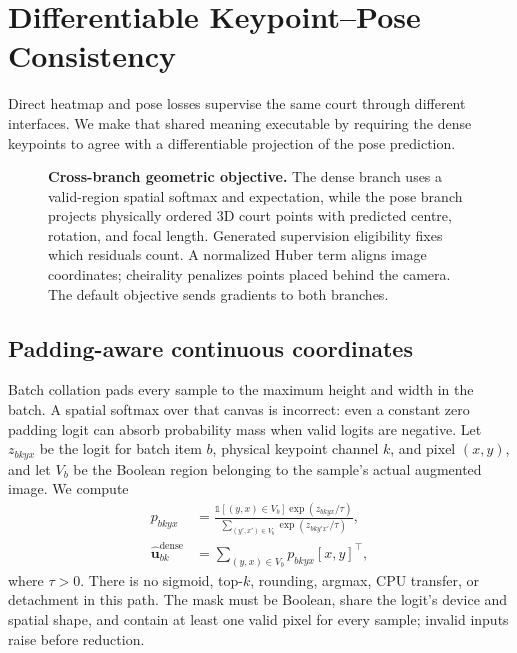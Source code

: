 \section{Differentiable Keypoint--Pose Consistency}
\label{sec:consistency}

Direct heatmap and pose losses supervise the same court through different
interfaces.  We make that shared meaning executable by requiring the dense
keypoints to agree with a differentiable projection of the pose prediction.

\begin{figure}[t]
  \centering
  \resizebox{\linewidth}{!}{}
  \caption{\textbf{Cross-branch geometric objective.}  The dense branch uses a
  valid-region spatial softmax and expectation, while the pose branch projects
  physically ordered 3D court points with predicted centre, rotation, and focal
  length.  Generated supervision eligibility fixes which residuals count.  A normalized
  Huber term aligns image coordinates; cheirality penalizes points placed
  behind the camera.  The default objective sends gradients to both branches.}
  \label{fig:consistency}
\end{figure}

\subsection{Padding-aware continuous coordinates}

Batch collation pads every sample to the maximum height and width in the batch.
A spatial softmax over that canvas is incorrect: even a constant zero padding
logit can absorb probability mass when valid logits are negative.  Let
\(z_{bkyx}\) be the logit for batch item \(b\), physical keypoint channel \(k\),
and pixel \((x,y)\), and let \(V_b\) be the Boolean region belonging to the
sample's actual augmented image.  We compute
\begin{align}
  p_{bkyx}
    &=\frac{\mathbb{1}[(y,x)\in V_b]\exp(z_{bkyx}/\tau)}
      {\sum_{(y',x')\in V_b}\exp(z_{bky'x'}/\tau)}, \\
  \widehat{\mathbf{u}}^{\mathrm{dense}}_{bk}
    &=\sum_{(y,x)\in V_b}p_{bkyx}[x,y]^{\top},
  \label{eq:masked_expectation}
\end{align}
where \(\tau>0\).  There is no sigmoid, top-\(k\), rounding, argmax, CPU
transfer, or detachment in this path.  The mask must be Boolean, share the
logit's device and spatial shape, and contain at least one valid pixel for every
sample; invalid inputs raise before reduction.

